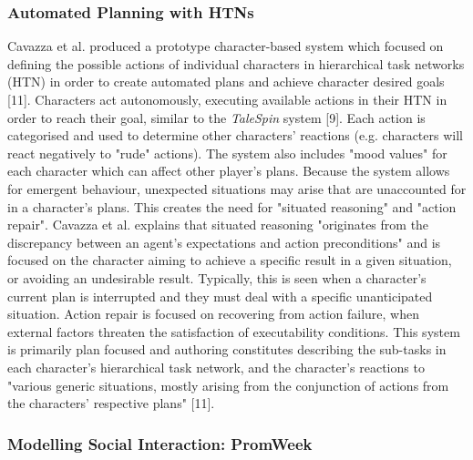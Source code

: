 \documentclass{sig-alternate-05-2015}
\begin{document}
\subsubsection{Automated Planning with HTNs}

Cavazza et al. produced a prototype character-based system which focused on defining the possible actions of individual characters in hierarchical task networks (HTN) in order to create automated plans and achieve character desired goals [11]. Characters act autonomously, executing available actions in their HTN in order to reach their goal, similar to the \textit{TaleSpin} system [9].  Each action is categorised and used to determine other characters' reactions (e.g. characters will react negatively to "rude" actions). The system also includes "mood values" for each character which can affect other player's plans. Because the system allows for emergent behaviour, unexpected situations may arise that are unaccounted for in a character's plans. This creates the need for "situated reasoning" and "action repair". Cavazza et al. explains that situated reasoning "originates from the discrepancy between an agent's expectations and action preconditions" and is focused on the character aiming to achieve a specific result in a given situation, or avoiding an undesirable result. Typically, this is seen when a character's current plan is interrupted and they must deal with a specific unanticipated situation. Action repair is focused on recovering from action failure, when external factors threaten the satisfaction of executability conditions. This system is primarily plan focused and authoring constitutes describing the sub-tasks in each character's hierarchical task network, and the character's reactions to "various generic situations, mostly arising
from the conjunction of actions from the characters'
respective plans" [11].\\ 

\subsubsection{Modelling Social Interaction: PromWeek}
\end{document}
